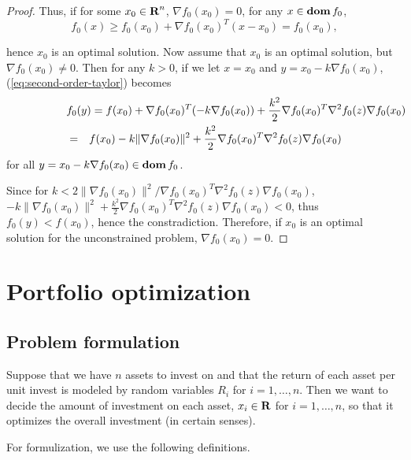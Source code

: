 \documentclass[10pt, twoside]{book}   	%
\newcommand{\grad}{\nabla}
\begin{document}
\begin{itemize}
\begin{proof}
Thus, if for some $x_0 \in {\mbox{\bf R}}^n$, $\grad f_0(x_0) = 0$, for any $x\in\mathop{\bf dom} f_0$,
\begin{equation}
f_0(x) \geq f_0(x_0) + \grad f_0(x_0) ^T (x-x_0) = f_0(x_0),
\end{equation}

hence $x_0$ is an optimal solution.
Now assume that $x_0$ is an optimal solution, but $\grad f_0(x_0) \neq 0$.
Then for any $k>0$, if we let $x=x_0$ and $y = x_0 - k \grad f_0(x_0) $,
(\ref{eq:second-order-taylor}) becomes
\begin{eqnarray*}
\lefteqn{
f_0(y) = f(x_0) + \grad f_0(x_0) ^T (-k \grad f_0(x_0)) + \frac{k^2}{2} \grad f_0(x_0) ^T \grad^2 f_0(z) \grad f_0(x_0)
}
\\
&=&
f(x_0) - k \|\grad f_0(x_0)\|^2 + \frac{k^2}{2} \grad f_0(x_0) ^T \grad^2 f_0(z) \grad f_0(x_0)
\end{eqnarray*}
for all $y = x_0 - k \grad f_0(x_0) \in \dom f_0$.

Since for $k< 2 \|\grad f_0(x_0)\|^2 / \grad f_0(x_0) ^T \grad^2 f_0(z) \grad f_0(x_0)$,
$-k \|\grad f_0(x_0)\|^2 + \frac{k^2}{2} \grad f_0(x_0) ^T \grad^2 f_0(z) \grad f_0(x_0) < 0$,
thus
$f_0(y) < f(x_0)$,
hence the constradiction.
Therefore, if $x_0$ is an optimal solution for the unconstrained problem, $\grad f_0(x_0) = 0$.

\end{proof}
\end{itemize}


\newpage
\chapter{Portfolio optimization}

\section{Problem formulation}

Suppose that we have $n$ assets to invest on
and that the return of each asset per unit invest is modeled by random variables $R_i$ for $i=1,\ldots,n$.
Then we want to decide the amount of investment on each asset, $x_i\in{\mbox{\bf R}}$ for $i=1,\ldots,n$,
so that it optimizes the overall investment (in certain senses).

For formulization, we use the following definitions.
\end{document}
